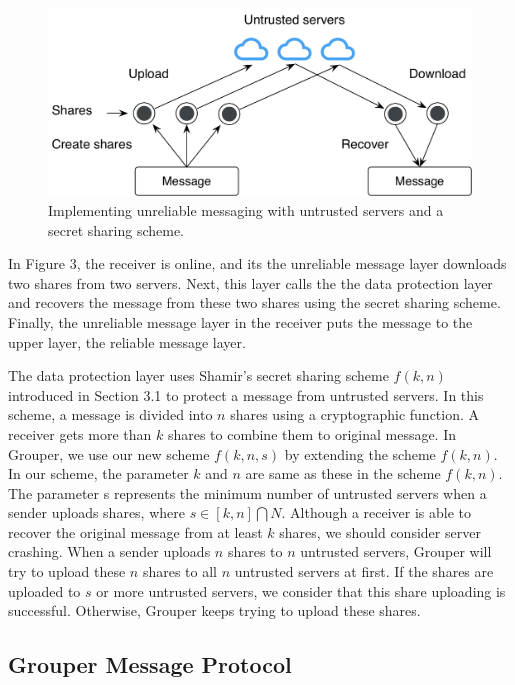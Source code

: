 \documentclass[twocolumn,10pt]{article}
\begin{document}
\begin{figure}[t]
	\centering
	\includegraphics[scale=0.42]{sync_flow}
	\caption{Implementing unreliable messaging with untrusted servers and a secret sharing scheme.}
\end{figure}

In Figure 3, the receiver is online, and its the unreliable message layer downloads two shares from two servers.
Next, this layer calls the the data protection layer and recovers the message from these two shares using the secret sharing scheme.
Finally, the unreliable message layer in the receiver puts the message to the upper layer, the reliable message layer.

The data protection layer uses Shamir's secret sharing scheme $f(k, n)$ introduced in Section 3.1 to protect a message from untrusted servers.
In this scheme, a message is divided into $n$ shares using a cryptographic function.
A receiver gets more than $k$ shares to combine them to original message.
In Grouper, we use our new scheme $ f(k, n, s)$ by extending the scheme $f(k, n)$.
In our scheme, the parameter $k$ and $n$ are same as these in the scheme $f(k, n)$. 
The parameter s represents the minimum number of untrusted servers when a sender uploads shares, where $s \in  [k, n] \bigcap N$.
Although a receiver is able to recover the original message from at least $k$ shares, we should consider server crashing. 
When a sender uploads $n$ shares to $n$ untrusted servers, Grouper will try to upload these $n$ shares to all $n$ untrusted servers at first.
If the shares are uploaded to $s$ or more untrusted servers, we consider that this share uploading is successful.
Otherwise, Grouper keeps trying to upload these shares.

\subsection{Grouper Message Protocol}
\end{document}
